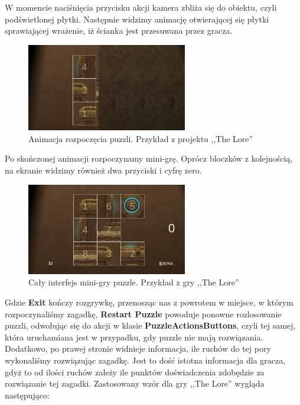 \documentclass[oneside,polski,logo]{amuthesis}
\begin{document}
W momencie naciśnięcia przycisku akcji kamera zbliża się do obiektu, czyli podświetlonej płytki. Następnie widzimy animację otwierającej się płytki sprawiającej wrażenie, iż ścianka jest przesuwana przez gracza.
\begin{figure}[h]
	\centering
	\includegraphics[width=7cm]{images/tyrek/otwieraniePuzzli.png}
	\caption{Animacja rozpoczęcia puzzli. Przykład z projektu ,,The Lore''}
\end{figure}

Po skończonej animacji rozpoczynamy mini-grę. Oprócz bloczków z kolejnością, na ekranie widzimy również dwa przyciski i cyfrę zero.
\begin{figure}[h]
	\centering
	\includegraphics[width=7cm]{images/tyrek/puzzlebuttons.png}
	\caption{Cały interfejs mini-gry puzzle. Przykład z gry ,,The Lore''}
\end{figure}

Gdzie \textbf{Exit} kończy rozgrywkę, przenosząc nas z powrotem w miejsce, w którym rozpoczynaliśmy zagadkę, \textbf{Restart Puzzle} powoduje ponowne rozlosowanie puzzli, odwołując się do akcji w klasie \textbf{PuzzleActionsButtons}, czyli tej samej, która uruchamiana jest w przypadku, gdy puzzle nie mają rozwiązania. Dodatkowo, po prawej stronie widnieje informacja, ile ruchów do tej pory wykonaliśmy rozwiązując zagadkę. Jest to dość istotna informacja dla gracza, gdyż to od ilości ruchów zależy ile punktów doświadczenia zdobędzie za rozwiązanie tej zagadki. Zastosowany wzór dla gry ,,The Lore'' wygląda następująco:
\end{document}
